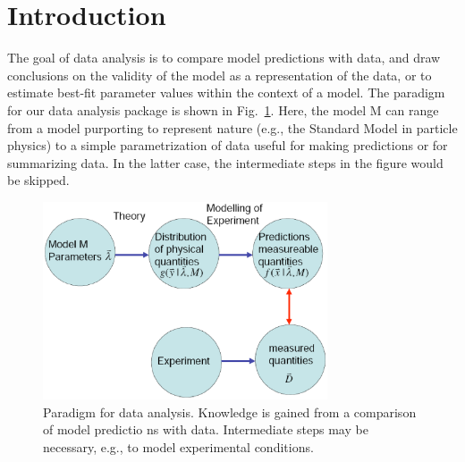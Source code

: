 \documentclass[11pt, a4paper]{article}
\begin{document}
\pagebreak 


\thispagestyle{empty} 

\tableofcontents

\pagebreak 


\section{Introduction}

The goal of data analysis is to compare model predictions with data,
and draw conclusions on the validity of the model as a representation
of the data, or to estimate best-fit parameter values within the
context of a model. The paradigm for our data analysis package is
shown in Fig.~\ref{fig:scheme}.  Here, the model M can range from a
model purporting to represent nature (e.g., the Standard Model in
particle physics) to a simple parametrization of data useful for
making predictions or for summarizing data.  In the latter case, the
intermediate steps in the figure would be skipped. \\ 

\begin{figure}[htbp] %
\centering
\includegraphics[width=0.75\textwidth]{scheme.eps} 
\caption{Paradigm for data analysis.  Knowledge is gained from a
comparison of model predictio ns with data.  Intermediate steps may be
necessary, e.g., to model experimental conditions.}
\label{fig:scheme}
\end{figure}
\end{document}
